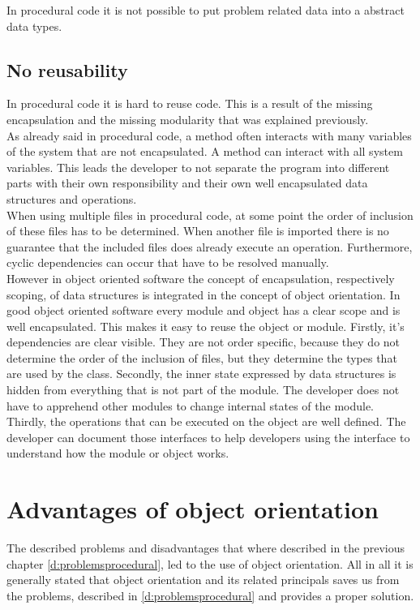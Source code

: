 In procedural code it is not possible to put problem related data into a abstract data types.

\subsection*{No reusability}
In procedural code it is hard to reuse code. This is a result of the missing encapsulation and the missing modularity that was explained previously.\\

As already said in procedural code, a method often interacts with many variables of the system that are not encapsulated. A method can interact with all system variables. This leads the developer to not separate the program into different parts with their own responsibility and their own well encapsulated data structures and operations. \\

When using multiple files in procedural code, at some point the order of inclusion of these files has to be determined. When another file is imported there is no guarantee that the included files does already execute an operation. Furthermore, cyclic dependencies can occur that have to be resolved manually. \\

However in object oriented software the concept of encapsulation, respectively scoping, of data structures is integrated in the concept of object orientation.  In good object oriented software every module and object has a clear scope and is well encapsulated. This makes it easy to reuse the object or module. Firstly, it's dependencies are clear visible. They are not order specific, because they do not determine the order of the inclusion of files, but they determine the types that are used by the class. Secondly, the inner state expressed by data structures is hidden from everything that is not part of the module. The developer does not have to apprehend other modules to change internal states of the module. Thirdly, the operations that can be executed on the object are well defined. The developer can document those interfaces to help developers using the interface to understand how the module or object works.

\section{Advantages of object orientation}
The described problems and disadvantages that where described in the previous chapter \ref{d:problemsprocedural}, led to the use of object orientation. 
All in all it is generally stated that object orientation and its related principals saves us from the problems, described in \ref{d:problemsprocedural} and provides a proper solution. \\

